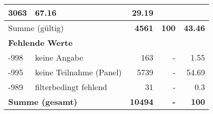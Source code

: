 \begin{longtable}{lXrrr}
       \num{3063} &
       \num[round-mode=places,round-precision=2]{67,16} &
         \num[round-mode=places,round-precision=2]{29,19} \\
     \midrule
     \multicolumn{2}{l}{Summe (gültig)} &
       \textbf{\num{4561}} &
     \textbf{100} &
       \textbf{\num[round-mode=places,round-precision=2]{43,46}} \\
     \multicolumn{5}{l}{\textbf{Fehlende Werte}}\\
       -998 &
       keine Angabe &
         \num{163} &
        - &
         \num[round-mode=places,round-precision=2]{1,55} \\
       -995 &
       keine Teilnahme (Panel) &
         \num{5739} &
        - &
         \num[round-mode=places,round-precision=2]{54,69} \\
       -989 &
       filterbedingt fehlend &
         \num{31} &
        - &
         \num[round-mode=places,round-precision=2]{0,3} \\
     \midrule
     \multicolumn{2}{l}{\textbf{Summe (gesamt)}} &
          \textbf{\num{10494}} &
        \textbf{-} &
        \textbf{100} \\
     \bottomrule
     \end{longtable}
     
